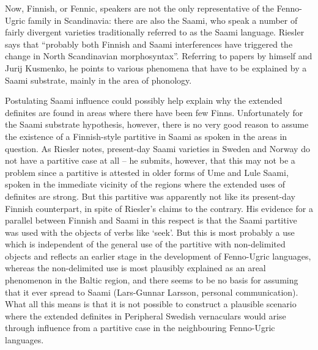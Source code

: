 
Now, Finnish, or Fennic, speakers are not the only representative of the Fenno-Ugric family in Scandinavia: there are also the Saami, who speak a number of fairly divergent varieties traditionally referred to as the Saami language. Riesler says that “probably both Finnish and Saami interferences have triggered the change in North Scandinavian morphosyntax”. Referring to papers by himself and Jurij Kusmenko, he points to various phenomena that have to be explained by a Saami substrate, mainly in the area of phonology.


Postulating Saami influence could possibly help explain why the extended definites are found in areas where there have been few Finns. Unfortunately for the Saami substrate hypothesis, however, there is no very good reason to assume the existence of a Finnish-style partitive in Saami as spoken in the areas in question. As Riesler notes, present-day Saami varieties in Sweden and Norway do not have a partitive case at all – he submits, however, that this may not be a problem since a partitive is attested in older forms of Ume and Lule Saami, spoken in the immediate vicinity of the regions where the extended uses of  definites are strong. But this partitive was apparently not like its present-day Finnish counterpart, in spite of Riesler’s claims to the contrary. His evidence for a parallel between Finnish and Saami in this respect is that the Saami partitive was used with the objects of verbs like ‘seek’. But this is most probably a use which is independent of the general use of the partitive with non-delimited objects and reflects an earlier stage in the development of Fenno-Ugric languages, whereas the non-delimited use is most plausibly explained as an areal phenomenon in the Baltic region, and there seems to be no basis for assuming that it ever spread to Saami (Lars-Gunnar Larsson, personal communication). What all this means is that it is not possible to construct a plausible scenario where the extended definites in Peripheral Swedish vernaculars would arise through influence from a partitive case in the neighbouring Fenno-Ugric languages. 


